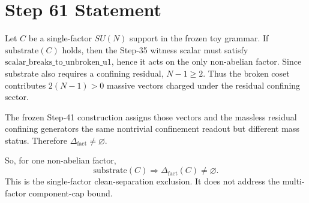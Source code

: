 \documentclass[11pt]{article}
\begin{document}
\section*{Step 61 Statement}
Let \(C\) be a single-factor \(SU(N)\) support in the frozen toy grammar. If \(\mathrm{substrate}(C)\) holds, then the Step-35 witness scalar must satisfy \(\mathrm{scalar\_breaks\_to\_unbroken\_u1}\), hence it acts on the only non-abelian factor. Since substrate also requires a confining residual, \(N-1\ge 2\). Thus the broken coset contributes \(2(N-1)>0\) massive vectors charged under the residual confining sector.

The frozen Step-41 construction assigns those vectors and the massless residual confining generators the same nontrivial confinement readout but different mass status. Therefore \(\Delta_{\mathrm{fact}}\ne\varnothing\).

So, for one non-abelian factor,
\[
  \mathrm{substrate}(C)\Rightarrow \Delta_{\mathrm{fact}}(C)\ne\varnothing.
\]
This is the single-factor clean-separation exclusion. It does not address the multi-factor component-cap bound.
\end{document}
